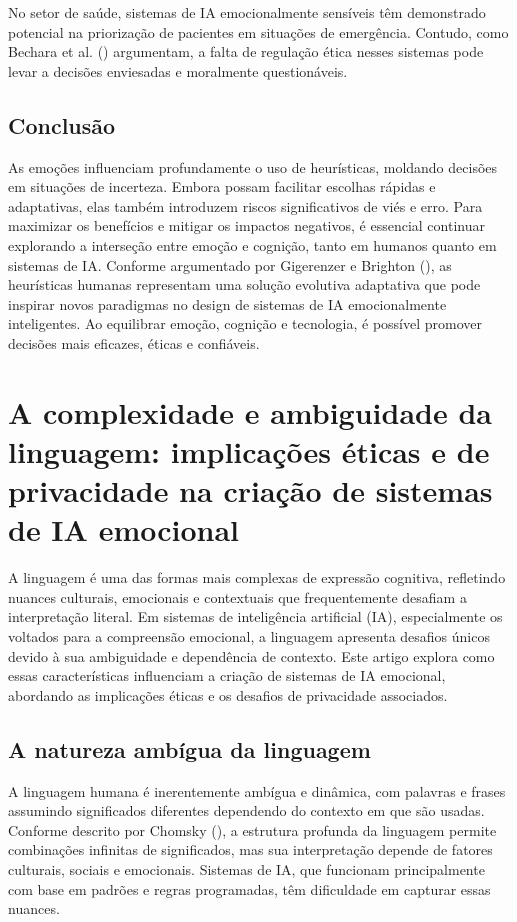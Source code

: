 \documentclass[a4paper,12pt]{report}
\begin{document}
	No setor de saúde, sistemas de IA emocionalmente sensíveis têm demonstrado potencial na priorização de pacientes em situações de emergência. Contudo, como Bechara et al. (\citeyear{bechara2000}) argumentam, a falta de regulação ética nesses sistemas pode levar a decisões enviesadas e moralmente questionáveis.
	
	\subsection{Conclusão}
	
	As emoções influenciam profundamente o uso de heurísticas, moldando decisões em situações de incerteza. Embora possam facilitar escolhas rápidas e adaptativas, elas também introduzem riscos significativos de viés e erro. Para maximizar os benefícios e mitigar os impactos negativos, é essencial continuar explorando a interseção entre emoção e cognição, tanto em humanos quanto em sistemas de IA. Conforme argumentado por Gigerenzer e Brighton (\citeyear{gigerenzer2009}), as heurísticas humanas representam uma solução evolutiva adaptativa que pode inspirar novos paradigmas no design de sistemas de IA emocionalmente inteligentes. Ao equilibrar emoção, cognição e tecnologia, é possível promover decisões mais eficazes, éticas e confiáveis.
	
	
	\section{A complexidade e ambiguidade da linguagem: implicações éticas e de privacidade na criação de sistemas de IA emocional}
	
	A linguagem é uma das formas mais complexas de expressão cognitiva, refletindo nuances culturais, emocionais e contextuais que frequentemente desafiam a interpretação literal. Em sistemas de inteligência artificial (IA), especialmente os voltados para a compreensão emocional, a linguagem apresenta desafios únicos devido à sua ambiguidade e dependência de contexto. Este artigo explora como essas características influenciam a criação de sistemas de IA emocional, abordando as implicações éticas e os desafios de privacidade associados.
	
	\subsection{A natureza ambígua da linguagem}
	
	A linguagem humana é inerentemente ambígua e dinâmica, com palavras e frases assumindo significados diferentes dependendo do contexto em que são usadas. Conforme descrito por Chomsky (\citeyear{chomsky1965}), a estrutura profunda da linguagem permite combinações infinitas de significados, mas sua interpretação depende de fatores culturais, sociais e emocionais. Sistemas de IA, que funcionam principalmente com base em padrões e regras programadas, têm dificuldade em capturar essas nuances.
	
\end{document}
